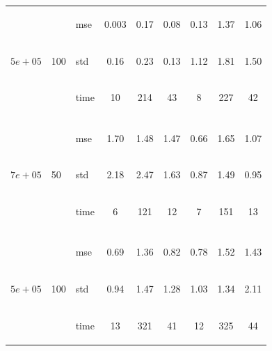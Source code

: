 \documentclass{article} %
\newcommand{\efoo}{\end{footnotesize}}
\newcommand{\bfoo}{\begin{footnotesize}}
\begin{document}
\begin{table}[t]
\begin{center}
\begin{small}
\begin{sc}
\begin{tabular}{lllcccccc}
\\
\multirow{3}{*}{$5e+05$}&\multirow{3}{*}{100}&\bfoo mse\efoo&0.003&0.17&0.08&0.13&1.37&1.06\\
&&\bfoo std\efoo &0.16&0.23&0.13&1.12&1.81&1.50\\
&&\bfoo time\efoo &10&214&43&8&227&42\\

\\
\multirow{3}{*}{$7e+05$}&\multirow{3}{*}{50}&\bfoo mse\efoo&1.70&1.48&1.47&0.66&1.65&1.07\\
&&\bfoo std\efoo &2.18&2.47&1.63&0.87&1.49&0.95\\
&&\bfoo time\efoo &6&121&12&7&151&13\\

\\
\multirow{3}{*}{$5e+05$}&\multirow{3}{*}{100}&\bfoo mse\efoo&0.69&1.36&0.82&0.78&1.52&1.43\\
&&\bfoo std\efoo &0.94&1.47&1.28&1.03&1.34&2.11\\
&&\bfoo time\efoo &13&321&41&12&325&44\\

 \hline
\end{tabular}
\end{sc}
\end{small}
\end{center}
\vskip -0.1in
\end{table}
\end{document}
